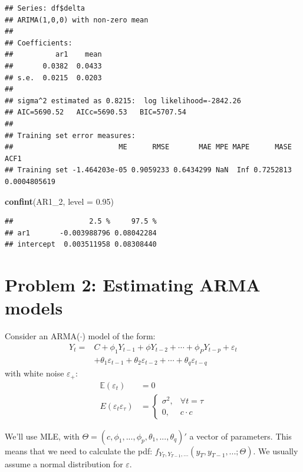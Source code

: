 \documentclass[11pt, a4paper]{report}
\newenvironment{Shaded}{\begin{snugshade}}{\end{snugshade}}
\newcommand{\DataTypeTok}[1]{\textcolor[rgb]{0.13,0.29,0.53}{#1}}
\newcommand{\DecValTok}[1]{\textcolor[rgb]{0.00,0.00,0.81}{#1}}
\newcommand{\FloatTok}[1]{\textcolor[rgb]{0.00,0.00,0.81}{#1}}
\newcommand{\KeywordTok}[1]{\textcolor[rgb]{0.13,0.29,0.53}{\textbf{#1}}}
\newcommand{\NormalTok}[1]{#1}
\theoremstyle{plain}
\theoremstyle{plain}
\theoremstyle{remark}
\begin{document}
\begin{verbatim}
## Series: df$delta 
## ARIMA(1,0,0) with non-zero mean 
## 
## Coefficients:
##          ar1    mean
##       0.0382  0.0433
## s.e.  0.0215  0.0203
## 
## sigma^2 estimated as 0.8215:  log likelihood=-2842.26
## AIC=5690.52   AICc=5690.53   BIC=5707.54
## 
## Training set error measures:
##                         ME      RMSE       MAE MPE MAPE      MASE         ACF1
## Training set -1.464203e-05 0.9059233 0.6434299 NaN  Inf 0.7252813 0.0004805619
\end{verbatim}

\begin{Shaded}
\begin{Highlighting}[]
\KeywordTok{confint}\NormalTok{(AR1_}\DecValTok{2}\NormalTok{, }\DataTypeTok{level =} \FloatTok{0.95}\NormalTok{)}
\end{Highlighting}
\end{Shaded}

\begin{verbatim}
##                  2.5 %     97.5 %
## ar1       -0.003988796 0.08042284
## intercept  0.003511958 0.08308440
\end{verbatim}


\chapter{Problem 2: Estimating ARMA models} \label{Problem-2}

Consider an ARMA($\cdot$) model of the form:
$$
\begin{aligned}
Y_{t}=& C+\phi_{1} Y_{t-1}+\phi Y_{t-2}+\cdots+\phi_{P} Y_{t-p}+\varepsilon_{t} \\
&+\theta_{1} \varepsilon_{t-1}+\theta_{2} \varepsilon_{t-2}+\cdots+\theta_{q} \varepsilon_{t-q}
\end{aligned}
$$
with white noise $\varepsilon_{+}$:
$$
\begin{aligned}
\mathbb{E}\left(\varepsilon_{t}\right) &=0 \\
E\left(\varepsilon_{t} \varepsilon_{\tau}\right) &=\left\{\begin{array}{ll}
\sigma^{2}, & \forall t=\tau \\
0, & c \cdot c
\end{array}\right.
\end{aligned}
$$

We'll use MLE, with $\Theta = (c, \phi_1, ..., \phi_p, \theta_1, ..., \theta_q)'$ a vector of parameters. This means that we need to calculate the pdf: $f_{Y_T, Y_{T-1},...}(y_T, y_{T-1},...; \Theta)$. We usually assume a normal distribution for $\varepsilon$.
\end{document}
